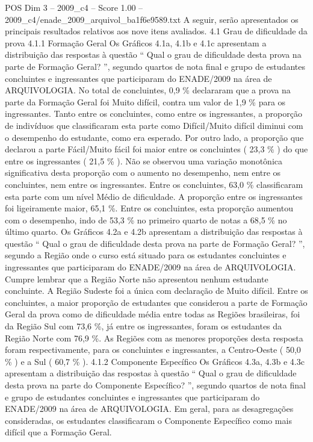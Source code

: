 \begin{textsample}{POS Dim 3 – 2009\_c4 – Score 1.00 – 2009\_c4/enade\_2009\_arquivol\_ba1f6e9589.txt}
A seguir, serão apresentados os principais resultados relativos aos nove itens avaliados. 4.1 Grau de dificuldade da prova 4.1.1 Formação Geral Os Gráficos 4.1a, 4.1b e 4.1c apresentam a distribuição das respostas à questão “ Qual o grau de dificuldade desta prova na parte de Formação Geral? ”, segundo quartos de nota final e grupo de estudantes concluintes e ingressantes que participaram do ENADE/2009 na área de ARQUIVOLOGIA.
No total de concluintes, 0,9 \% declararam que a prova na parte da Formação Geral foi Muito difícil, contra um valor de 1,9 \% para os ingressantes.
Tanto entre os concluintes, como entre os ingressantes, a proporção de indivíduos que classificaram esta parte como Difícil/Muito difícil diminui com o desempenho do estudante, como era esperado.
Por outro lado, a proporção que declarou a parte Fácil/Muito fácil foi maior entre os concluintes ( 23,3 \% ) do que entre os ingressantes ( 21,5 \% ).
Não se observou uma variação monotônica significativa desta proporção com o aumento no desempenho, nem entre os concluintes, nem entre os ingressantes.
Entre os concluintes, 63,0 \% classificaram esta parte com um nível Médio de dificuldade.
A proporção entre os ingressantes foi ligeiramente maior, 65,1 \%.
Entre os concluintes, esta proporção aumentou com o desempenho, indo de 53,3 \% no primeiro quarto de notas a 68,5 \% no último quarto.
Os Gráficos 4.2a e 4.2b apresentam a distribuição das respostas à questão “ Qual o grau de dificuldade desta prova na parte de Formação Geral? ”, segundo a Região onde o curso está situado para os estudantes concluintes e ingressantes que participaram do ENADE/2009 na área de ARQUIVOLOGIA.
Cumpre lembrar que a Região Norte não apresentou nenhum estudante concluinte.
A Região Sudeste foi a única com declaração de Muito difícil.
Entre os concluintes, a maior proporção de estudantes que considerou a parte de Formação Geral da prova como de dificuldade média entre todas as Regiões brasileiras, foi da Região Sul com 73,6 \%, já entre os ingressantes, foram os estudantes da Região Norte com 76,9 \%.
As Regiões com as menores proporções desta resposta foram respectivamente, para os concluintes e ingressantes, a Centro-Oeste ( 50,0 \% ) e a Sul ( 60,7 \% ). 4.1.2 Componente Específico Os Gráficos 4.3a, 4.3b e 4.3c apresentam a distribuição das respostas à questão “ Qual o grau de dificuldade desta prova na parte do Componente Específico? ”, segundo quartos de nota final e grupo de estudantes concluintes e ingressantes que participaram do ENADE/2009 na área de ARQUIVOLOGIA.
Em geral, para as desagregações consideradas, os estudantes classificaram o Componente Específico como mais difícil que a Formação Geral.

\end{textsample}
